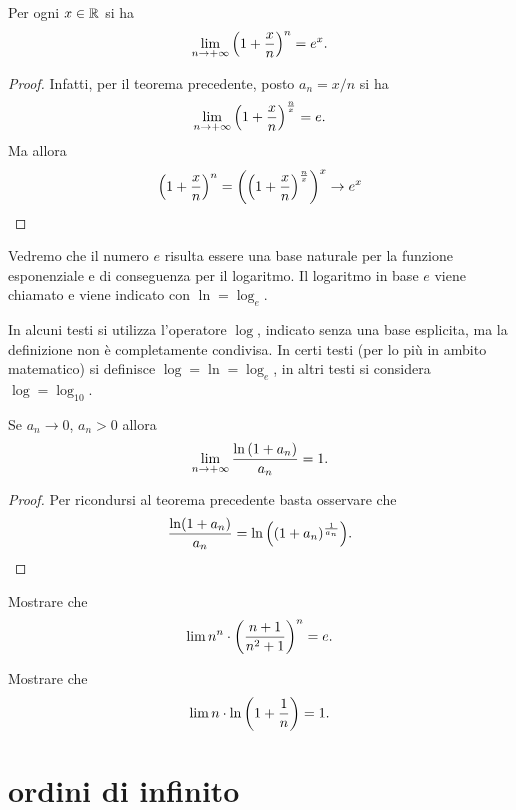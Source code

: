 \begin{corollary}
Per ogni $x\in \mathbb R$ si ha
\[
  \lim_{n\to +\infty} {\left( 1+ \frac x n \right)}^n = e^x.
\]
\end{corollary}
%
\begin{proof}
Infatti, per il teorema precedente, posto $a_n = x/n$ si ha
\[
\lim_{n\to +\infty}{\left( 1+\frac x n \right)}^{\frac n x} = e.
\]
Ma allora
\[
{\left( 1+ \frac x n \right)}^n = {\left( {\left( 1+\frac x n \right)}^{\frac n x} \right)}^x
\to e^x
\]
\end{proof}

\begin{definition}
Vedremo che il numero $e$ risulta essere una base naturale per la funzione
esponenziale e di conseguenza per il logaritmo. Il logaritmo in base
$e$ viene chiamato  e viene indicato con $\ln = \log_e$.
\end{definition}

In alcuni testi si utilizza l'operatore $\log$, indicato senza una base esplicita,
ma la definizione non è completamente condivisa.
In certi testi (per lo più in ambito matematico)
si definisce $\log  = \ln = \log_e$,
in altri testi si considera $\log = \log_{10}$.

\begin{corollary}
Se $a_n \to 0$, $a_n>0$ allora
\[
 \lim_{n\to +\infty} \frac{\ln {\left( 1+ a_n \right)}}{a_n} = 1.
\]
\end{corollary}
%
\begin{proof}
Per ricondursi al teorema precedente basta osservare che
\[
  \frac{\ln(1+a_n)}{a_n}
  = \ln {\left( (1+a_n)^{\frac 1 {a_n}} \right)}.
\]
\end{proof}

\begin{exercise}
Mostrare che
\[
  \lim n^n\cdot {\left( \frac{n+1}{n^2+1} \right)}^n = e.
\]
\end{exercise}

\begin{exercise}
Mostrare che
\[
\lim n\cdot \ln{\left( 1 + \frac 1 n \right)} = 1.
\]
\end{exercise}

\section{ordini di infinito}

